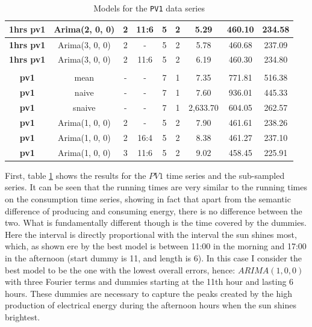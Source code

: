 \documentclass[12pt,a4paper,titlepage]{report}
\begin{document}
\begin{table}[htbp]
\begin{tabular}{|c|c|c|c|c|c|c|c|c|}
        \textbf{1hrs pv1} & Arima(2, 0, 0)          & 2 & 11:6 & 5 & 2 & 5.29     & 460.10 & 234.58 \\ \hline
        \textbf{1hrs pv1} & Arima(3, 0, 0)          & 2 & -    & 5 & 2 & 5.78     & 460.68 & 237.09 \\ \hline
        \textbf{1hrs pv1} & Arima(3, 0, 0)          & 2 & 11:6 & 5 & 2 & 6.19     & 460.30 & 234.80 \\ \hline
        \textbf{}         &                         &   &      &   &   &          &        &        \\ \hline
        \textbf{pv1}      & mean                    & - & -    & 7 & 1 & 7.35     & 771.81 & 516.38 \\ \hline
        \textbf{pv1}      & naive                   & - & -    & 7 & 1 & 7.60     & 936.01 & 445.33 \\ \hline
        \textbf{pv1}      & snaive                  & - & -    & 7 & 1 & 2,633.70 & 604.05 & 262.57 \\ \hline
        \textbf{pv1}      & Arima(1, 0, 0)          & 2 & -    & 5 & 2 & 7.90     & 461.61 & 238.26 \\ \hline
        \textbf{pv1}      & Arima(1, 0, 0)          & 2 & 16:4 & 5 & 2 & 8.38     & 461.27 & 237.10 \\ \hline
        \textbf{pv1}      & Arima(1, 0, 0)          & 3 & 11:6 & 5 & 2 & 9.02     & 458.45 & 225.91 \\ \hline
    \end{tabular}
    
    \centering
    \caption{Models for the \texttt{PV1} data series}
    \label{pv1results}
\end{table}

First, table \ref{pv1results} shows the results for the $ PV1 $ time series and the sub-sampled series.
It can be seen that the running times are very similar to the running times on the consumption time series, showing in fact that apart from the semantic difference of producing and consuming energy, there is no difference between the two.
What is fundamentally different though is the time covered by the dummies. Here the interval is directly proportional with the interval the sun shines most, which, as shown ere by the best model is between 11:00 in the morning and 17:00 in the afternoon (start dummy is 11, and length is 6).
In this case I consider the best model to be the one with the lowest overall errors, hence: $ ARIMA(1, 0, 0) $ with three Fourier terms and dummies starting at the 11th hour and lasting 6 hours. These dummies are necessary to capture the peaks created by the high production of electrical energy during the afternoon hours when the sun shines brightest.
\end{document}
